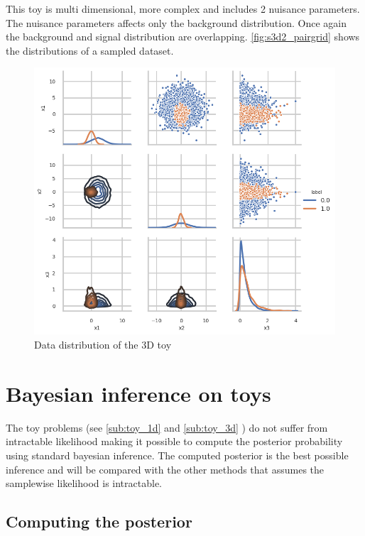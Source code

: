 This toy is multi dimensional, more complex and includes 2 nuisance parameters.
The nuisance parameters affects only the background distribution.
Once again the background and signal distribution are overlapping.
\autoref{fig:s3d2_pairgrid} shows the distributions of a sampled dataset.

\begin{figure}[htb]
    \includegraphics[width=\linewidth]{s3d2/pairgrid}
    \caption{Data distribution of the 3D toy}
    \label{fig:s3d2_pairgrid}
\end{figure}






\section{Bayesian inference on toys} %
\label{sec:bayesian_inference_on_toys}


The toy problems (see \autoref{sub:toy_1d} and \autoref{sub:toy_3d} ) do not suffer from intractable likelihood making it possible to compute the posterior probability using standard bayesian inference.
The computed posterior is the best possible inference and will be compared with the other methods that assumes the samplewise likelihood is intractable.

\subsection{Computing the posterior} %
\label{sub:computing_the_posterior}

